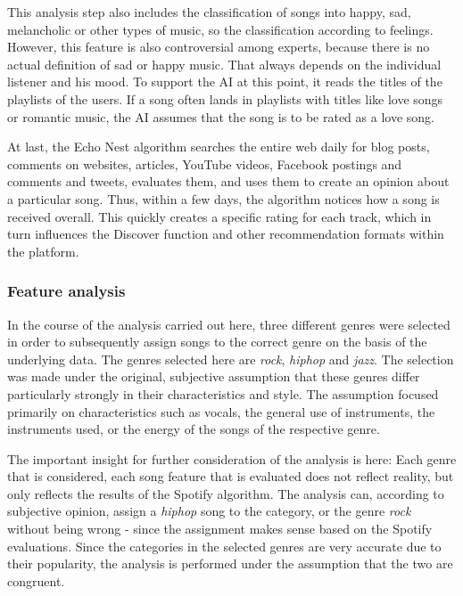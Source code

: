 This analysis step also includes the classification of songs into happy, sad,
melancholic or other types of music, so the classification according to feelings.
However, this feature is also controversial among experts, because there is no actual definition of sad or happy music. 
That always depends on the individual listener and his mood. To support the AI at this point,
it reads the titles of the playlists of the users. 
If a song often lands in playlists with titles like love songs or romantic music,
the AI assumes that the song is to be rated as a love song. 

At last, the Echo Nest algorithm searches the entire web daily for blog posts, comments on websites,
articles, YouTube videos, Facebook postings and comments and tweets, 
evaluates them, and uses them to create an opinion about a particular song.
Thus, within a few days, the algorithm notices how a song is received overall.  
This quickly creates a specific rating for each track, which in turn influences the
Discover function and other recommendation formats within the platform. 

\subsubsection{Feature analysis}
In the course of the analysis carried out here, three different genres were selected in order
to subsequently assign songs to the correct genre on the basis of the underlying data. 
The genres selected here are \emph{\emph{rock}}, \emph{\emph{hiphop}} and \emph{\emph{jazz}}. The selection was made under the original, 
subjective assumption that these genres differ particularly strongly in their characteristics and style. 
The assumption focused primarily on characteristics such as vocals, the general use of instruments,
the instruments used, or the energy of the songs of the respective genre.

The important insight for further consideration of the analysis is here:
Each genre that is considered, each song feature that is evaluated does not reflect reality, 
but only reflects the results of the Spotify algorithm. The analysis can,
according to subjective opinion, assign a \emph{\emph{hiphop}} song to the category, 
or the genre \emph{rock} without being wrong - since the assignment makes sense based on the Spotify evaluations. 
Since the categories in the selected genres are very accurate due to their popularity,
the analysis is performed under the assumption that the two are congruent. 

